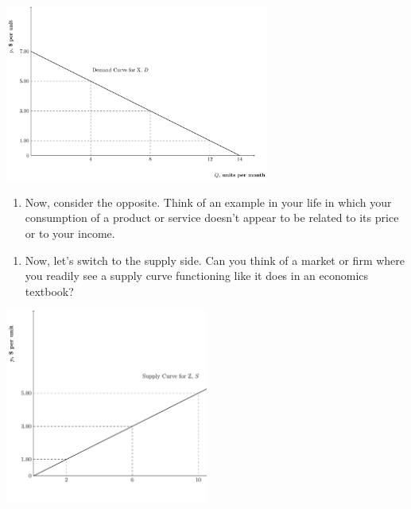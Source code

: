 \documentclass[11pt,]{article}
\providecommand{\tightlist}{%
  \setlength{\itemsep}{0pt}\setlength{\parskip}{0pt}}
\begin{document}
\centering

\includegraphics[width=0.65\textwidth]{week_1_problems_files/figure-latex/demand_1-1.png}

\begin{enumerate}
\def\labelenumi{\arabic{enumi}.}
\setcounter{enumi}{2}
\tightlist
\item
  Now, consider the opposite. Think of an example in your life in which
  your consumption of a product or service doesn't appear to be related
  to its price or to your income.
\end{enumerate}

\newpage

\begin{enumerate}
\def\labelenumi{\arabic{enumi}.}
\setcounter{enumi}{3}
\tightlist
\item
  Now, let's switch to the supply side. Can you think of a market or
  firm where you readily see a supply curve functioning like it does in
  an economics textbook?
\end{enumerate}

\centering

\includegraphics[width=0.5\textwidth]{week_1_problems_files/figure-latex/supply_1-1.png}
\end{document}
